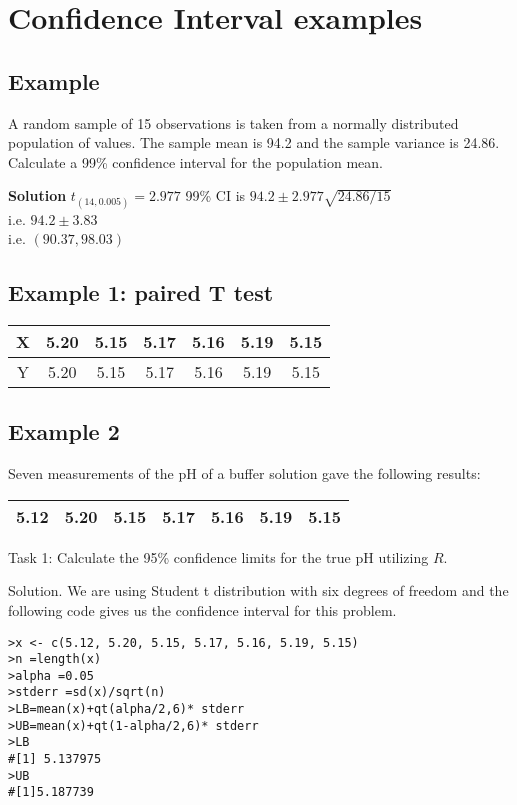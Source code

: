 ﻿



\section{Confidence Interval examples}



\subsection{Example}
A random sample of 15 observations is taken from a normally distributed population
of values. The sample mean is 94.2 and the sample variance is 24.86.
Calculate a 99\% confidence interval for the population mean.


\noindent \textbf{Solution}
$t_(14,0.005) = 2.977$
99\% CI is $94.2 \pm 2.977 \sqrt{24.86/15}$ \\i.e. $94.2 \pm 3.83$ \\i.e. $(90.37,98.03)$


\subsection{Example 1: paired T test}

\begin{center}
\begin{tabular}{|c|c|c|c|c|c|c|}
\hline
X & 5.20 & 5.15 & 5.17 & 5.16 & 5.19 & 5.15\\ \hline 
Y & 5.20 & 5.15 & 5.17 & 5.16 & 5.19 & 5.15\\
\hline
\end{tabular}
\end{center}

\subsection{Example 2}

Seven measurements of the pH of a buffer solution gave the
following results:

\begin{tabular}{|c|c|c|c|c|c|c|}
\hline
5.12 & 5.20 & 5.15 & 5.17 & 5.16 & 5.19 & 5.15\\
\hline
\end{tabular}

Task 1: Calculate the 95\% confidence limits for the true pH
utilizing $R$.


Solution. We are using Student t distribution with six degrees of
freedom and the following code gives us the confidence interval
for this problem.
\begin{verbatim}
>x <- c(5.12, 5.20, 5.15, 5.17, 5.16, 5.19, 5.15)
>n =length(x)
>alpha =0.05
>stderr =sd(x)/sqrt(n)
>LB=mean(x)+qt(alpha/2,6)* stderr
>UB=mean(x)+qt(1-alpha/2,6)* stderr
>LB
#[1] 5.137975
>UB
#[1]5.187739
\end{verbatim}

